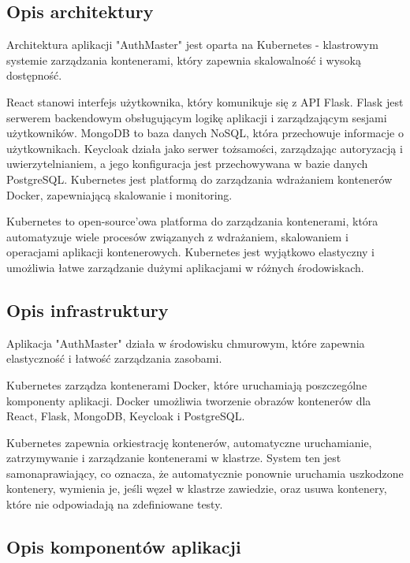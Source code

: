 \documentclass[12pt,a4paper]{article}
\begin{document}
\subsection{Opis architektury}
\label{sec:introduction}
Architektura aplikacji "AuthMaster" jest oparta na Kubernetes\cite{kubernetes} - klastrowym systemie zarządzania kontenerami, który zapewnia skalowalność i wysoką dostępność.

React stanowi interfejs użytkownika, który komunikuje się z API Flask. Flask jest serwerem backendowym obsługującym logikę aplikacji i zarządzającym sesjami użytkowników. MongoDB to baza danych NoSQL, która przechowuje informacje o użytkownikach. Keycloak\cite{keycloak} działa jako serwer tożsamości, zarządzając autoryzacją i uwierzytelnianiem, a jego konfiguracja jest przechowywana w bazie danych PostgreSQL. Kubernetes jest platformą do zarządzania wdrażaniem kontenerów Docker\cite{docker}, zapewniającą skalowanie i monitoring.

Kubernetes to open-source'owa platforma do zarządzania kontenerami, która automatyzuje wiele procesów związanych z wdrażaniem, skalowaniem i operacjami aplikacji kontenerowych. Kubernetes jest wyjątkowo elastyczny i umożliwia łatwe zarządzanie dużymi aplikacjami w różnych środowiskach.


\subsection{Opis infrastruktury}
\label{sec:Users}

Aplikacja "AuthMaster" działa w środowisku chmurowym, które zapewnia elastyczność i łatwość zarządzania zasobami. 

Kubernetes zarządza kontenerami Docker, które uruchamiają poszczególne komponenty aplikacji. Docker umożliwia tworzenie obrazów kontenerów dla React, Flask, MongoDB, Keycloak i PostgreSQL.

Kubernetes zapewnia orkiestrację kontenerów, automatyczne uruchamianie, zatrzymywanie i zarządzanie kontenerami w klastrze. System ten jest samonaprawiający, co oznacza, że automatycznie ponownie uruchamia uszkodzone kontenery, wymienia je, jeśli węzeł w klastrze zawiedzie, oraz usuwa kontenery, które nie odpowiadają na zdefiniowane testy.

\subsection{Opis komponentów aplikacji}
\label{sec:FunctionalConditions}
\end{document}
